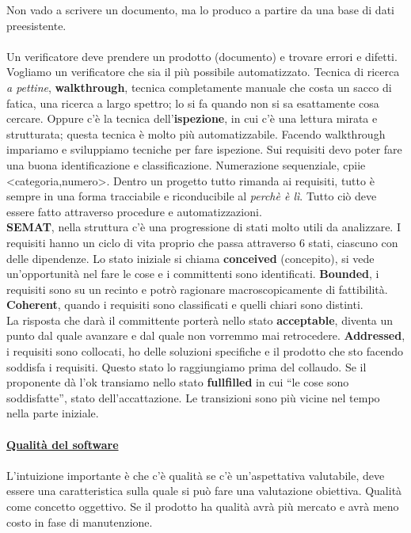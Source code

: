 \documentclass{article}
\begin{document}
Non vado a scrivere un documento, ma lo produco a partire da una base di dati preesistente.\\\\

Un verificatore deve prendere un prodotto (documento) e trovare errori e difetti. Vogliamo un verificatore che sia il più possibile automatizzato. Tecnica di ricerca \textit{a pettine}, \textbf{walkthrough}, tecnica completamente manuale che costa un sacco di fatica, una ricerca a largo spettro; lo si fa quando non si sa esattamente cosa cercare. Oppure c'è la tecnica dell'\textbf{ispezione}, in cui c'è una lettura mirata e strutturata; questa tecnica è molto più automatizzabile. Facendo walkthrough impariamo e sviluppiamo tecniche per fare ispezione. Sui requisiti devo poter fare una buona identificazione e classificazione. Numerazione sequenziale, cpiie <categoria,numero>. Dentro un progetto tutto rimanda ai requisiti, tutto è sempre in una forma tracciabile e riconducibile al \textit{perchè è lì}. Tutto ciò deve essere fatto attraverso procedure e automatizzazioni.\\
\textbf{SEMAT}, nella struttura c'è una progressione di stati molto utili da analizzare. I requisiti hanno un ciclo di vita proprio che passa attraverso 6 stati, ciascuno con delle dipendenze. Lo stato iniziale si chiama \textbf{conceived} (concepito), si vede un'opportunità nel fare le cose e i committenti sono identificati. \textbf{Bounded}, i requisiti sono su un recinto e potrò ragionare macroscopicamente di fattibilità. \textbf{Coherent}, quando i requisiti sono classificati e quelli chiari sono distinti.\\
La risposta che darà il committente porterà nello stato \textbf{acceptable}, diventa un punto dal quale avanzare e dal quale non vorremmo mai retrocedere. \textbf{Addressed}, i requisiti sono collocati, ho delle soluzioni specifiche e il prodotto che sto facendo soddisfa i requisiti. Questo stato lo raggiungiamo prima del collaudo. Se il proponente dà l'ok transiamo nello stato \textbf{fullfilled} in cui ``le cose sono soddisfatte'', stato dell'accattazione. Le transizioni sono più vicine nel tempo nella parte iniziale.\\\\

\underline{\textbf{Qualità del software}}\\\\

L'intuizione importante è che c'è qualità se c'è un'aspettativa valutabile, deve essere una caratteristica sulla quale si può fare una valutazione obiettiva. Qualità come concetto oggettivo. Se il prodotto ha qualità avrà più mercato e avrà meno costo in fase di manutenzione.\\
\end{document}
